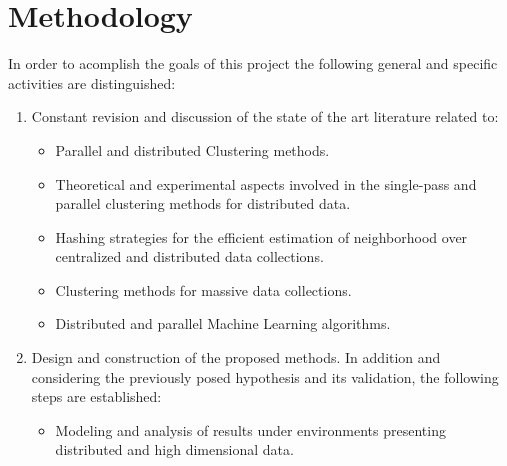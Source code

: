 \documentclass[10pt]{article}
\begin{document}
\section{Methodology}\label{sec:metodology}
In order to acomplish the goals of this project the following general and specific activities are distinguished:
\begin{enumerate}
    \item Constant revision and discussion of the state of the art literature related to:
        \begin{itemize}
            \item Parallel and distributed Clustering methods.
            \item Theoretical and experimental aspects involved in the single-pass and parallel clustering methods for distributed data. 
            \item Hashing strategies for the efficient estimation of neighborhood over centralized and distributed data collections.
            \item Clustering methods for massive data collections.
            \item Distributed and parallel Machine Learning algorithms.
        \end{itemize}
    \item Design and construction of the proposed methods. In addition and considering the previously posed hypothesis and its validation, the following steps are established:
\begin{itemize}
\item Modeling and analysis of results under environments presenting distributed and high dimensional data.


\end{itemize}
\end{enumerate}
\end{document}
